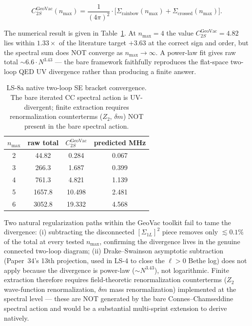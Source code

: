 \documentclass[11pt]{article}
\begin{document}
\begin{equation}
C_{2S}^{\text{GeoVac}}(n_\text{max}) = \frac{1}{(4\pi)^2} \cdot
\bigl[\Sigma_\text{rainbow}(n_\text{max}) + \Sigma_\text{crossed}(n_\text{max})\bigr].
\end{equation}

The numerical result is given in Table~\ref{tab:ls8a_native}.  At
$n_\text{max} = 4$ the value $C_{2S}^{\text{GeoVac}} = 4.82$ lies
within $1.33\times$ of the literature target $+3.63$ at the correct
sign and order, but the spectral sum does NOT converge as
$n_\text{max} \to \infty$.  A power-law fit gives raw total $\sim 6.6
\cdot N^{3.43}$ — the bare framework faithfully reproduces the
flat-space two-loop QED UV divergence rather than producing a finite
answer.

\begin{table}[ht]
\caption{LS-8a native two-loop SE bracket convergence.  The bare
iterated CC spectral action is UV-divergent; finite extraction
requires renormalization counterterms ($Z_2$, $\delta m$) NOT
present in the bare spectral action.}
\label{tab:ls8a_native}
\centering
\begin{tabular}{|c|c|c|c|}
\hline
$n_\text{max}$ & raw total & $C_{2S}^{\text{GeoVac}}$ & predicted MHz \\
\hline
2 & 44.82 & 0.284 & 0.067 \\
3 & 266.3 & 1.687 & 0.399 \\
4 & 761.3 & 4.821 & 1.139 \\
5 & 1657.8 & 10.498 & 2.481 \\
6 & 3052.8 & 19.332 & 4.568 \\
\hline
\end{tabular}
\end{table}

Two natural regularization paths within the GeoVac toolkit fail to
tame the divergence: (i) subtracting the disconnected $[\Sigma_{1L}]^2$
piece removes only $\lesssim 0.1\%$ of the total at every tested
$n_\text{max}$, confirming the divergence lives in the genuine
connected two-loop diagram; (ii) Drake--Swainson asymptotic
subtraction (Paper~34's 13th projection, used in LS-4 to close the
$\ell > 0$ Bethe log) does not apply because the divergence is
power-law ($\sim N^{3.43}$), not logarithmic.  Finite extraction
therefore requires field-theoretic renormalization counterterms
($Z_2$ wave-function renormalization, $\delta m$ mass renormalization)
implemented at the spectral level — these are NOT generated by the
bare Connes--Chamseddine spectral action and would be a substantial
multi-sprint extension to derive natively.
\end{document}
